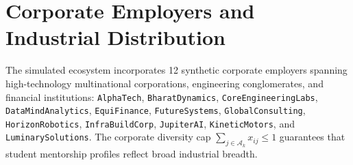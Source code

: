 \section{Corporate Employers and Industrial Distribution}
The simulated ecosystem incorporates 12 synthetic corporate employers spanning high-technology multinational corporations, engineering conglomerates, and financial institutions: \texttt{AlphaTech}, \texttt{BharatDynamics}, \texttt{CoreEngineeringLabs}, \texttt{DataMindAnalytics}, \texttt{EquiFinance}, \texttt{FutureSystems}, \texttt{GlobalConsulting}, \texttt{HorizonRobotics}, \texttt{InfraBuildCorp}, \texttt{JupiterAI}, \texttt{KineticMotors}, and \texttt{LuminarySolutions}. The corporate diversity cap $\sum_{j \in \mathcal{A}_k} x_{ij} \le 1$ guarantees that student mentorship profiles reflect broad industrial breadth.
